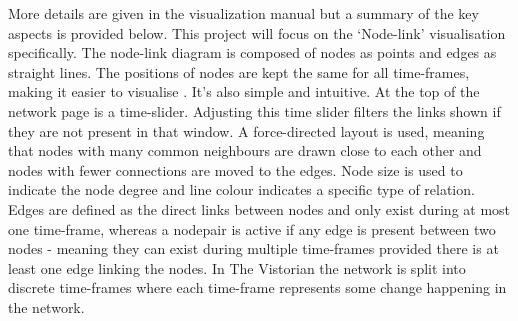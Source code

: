 More details are given in the visualization manual \cite{vismanual} but a summary of the key aspects is provided below.
This project will focus on the ‘Node-link’ visualisation specifically. The node-link diagram is composed of nodes as points and edges as straight lines. The positions of nodes are kept the same for all time-frames, making it easier to visualise \cite{tsotaivg}. It's also simple and intuitive.
At the top of the network page is a time-slider. Adjusting this time slider filters the links shown if they are not present in that window. A force-directed layout is used, meaning that nodes with many common neighbours are drawn close to each other and nodes with fewer connections are moved to the edges. Node size is used to indicate the node degree and line colour indicates a specific type of relation. Edges are defined as the direct links between nodes and only exist during at most one time-frame, whereas a nodepair is active if any edge is present between two nodes - meaning they can exist during multiple time-frames provided there is at least one edge linking the nodes. In The Vistorian the network is split into discrete time-frames where each time-frame represents some change happening in the network. 





